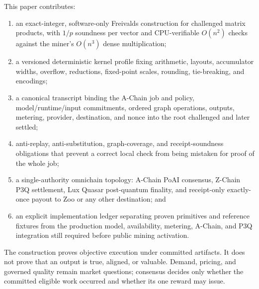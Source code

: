 This paper contributes:

\begin{enumerate}
  \item an exact-integer, software-only Freivalds construction for challenged matrix
  products, with $1/p$ soundness per vector and CPU-verifiable $O(n^2)$ checks against the
  miner's $O(n^3)$ dense multiplication;
  \item a versioned deterministic kernel profile fixing arithmetic, layouts, accumulator
  widths, overflow, reductions, fixed-point scales, rounding, tie-breaking, and encodings;
  \item a canonical transcript binding the A-Chain job and policy, model/runtime/input
  commitments, ordered graph operations, outputs, metering, provider, destination, and
  nonce into the root challenged and later settled;
  \item anti-replay, anti-substitution, graph-coverage, and receipt-soundness obligations
  that prevent a correct local check from being mistaken for proof of the whole job;
  \item a single-authority omnichain topology: A-Chain PoAI consensus, Z-Chain P3Q
  settlement, Lux Quasar post-quantum finality, and receipt-only exactly-once payout to
  Zoo or any other destination; and
  \item an explicit implementation ledger separating proven primitives and reference
  fixtures from the production model, availability, metering, A-Chain, and P3Q integration
  still required before public mining activation.
\end{enumerate}

The construction proves objective execution under committed artifacts. It does not prove
that an output is true, aligned, or valuable. Demand, pricing, and governed quality remain
market questions; consensus decides only whether the committed eligible work occurred and
whether its one reward may issue.
